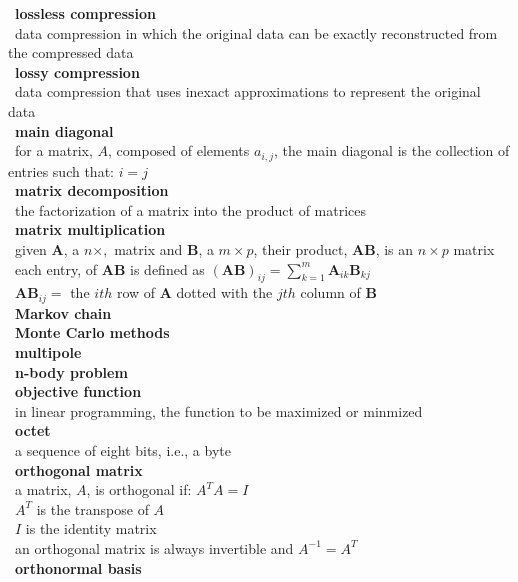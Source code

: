 \documentclass[10pt,letterpaper]{scrartcl}
\newcommand{\tbul}{\textbullet}
\newcommand{\tend}{\>\textendash}
\newcommand{\tasc}{\>\>\textasteriskcentered}
\begin{document}
\begin{tabbing}
\tbul\ \textbf{lossless compression} \\ 
    \tend\ data compression in which the original data can be exactly reconstructed from the compressed data \\
\tbul\ \textbf{lossy compression} \\ 
    \tend\ data compression that uses inexact approximations to represent the original data \\
\tbul\ \textbf{main diagonal} \\
    \tend\ for a matrix, $A$, composed of elements $a_{i,j}$, the main diagonal is the collection of entries such that: $i=j$ \\
\tbul\ \textbf{matrix decomposition} \\
    \tend\ the factorization of a matrix into the product of matrices \\
\tbul\ \textbf{matrix multiplication} \\
    \tend\ given $\mathbf{A}$, a $n\times ,$ matrix and $\mathbf{B}$, a $m\times p$, their product, $\mathbf{AB}$, is an $n\times p$ matrix\\
    \tend\ each entry, of $\mathbf{AB}$ is defined as $\displaystyle (\mathbf{AB})_{ij} = \sum_{k=1}^{m}\mathbf{A}_{ik}\mathbf{B}_{kj}$ \\
    \tend\ $\mathbf{AB}_{ij}=$ the $ith$ row of $\mathbf{A}$ dotted with the $jth$ column of $\mathbf{B}$ \\
\tbul\ \textbf{Markov chain} \\
\tbul\ \textbf{Monte Carlo methods} \\
\tbul\ \textbf{multipole} \\
\tbul\ \textbf{n-body problem} \\
\tbul\ \textbf{objective function} \\
    \tend\ in linear programming, the function to be maximized or minmized \\
\tbul\ \textbf{octet} \\ 
    \tend\ a sequence of eight bits, i.e., a byte \\
\tbul\ \textbf{orthogonal matrix} \\
    \tend\ a matrix, $A$, is orthogonal if: $A^TA=I$ \\
        \tasc\ $A^T$ is the transpose of $A$ \\
        \tasc\ $I$ is the identity matrix \\
    \tend\ an orthogonal matrix is always invertible and $A^{-1} = A^T$ \\
\tbul\ \textbf{orthonormal basis} \\

\end{tabbing}
\end{document}
